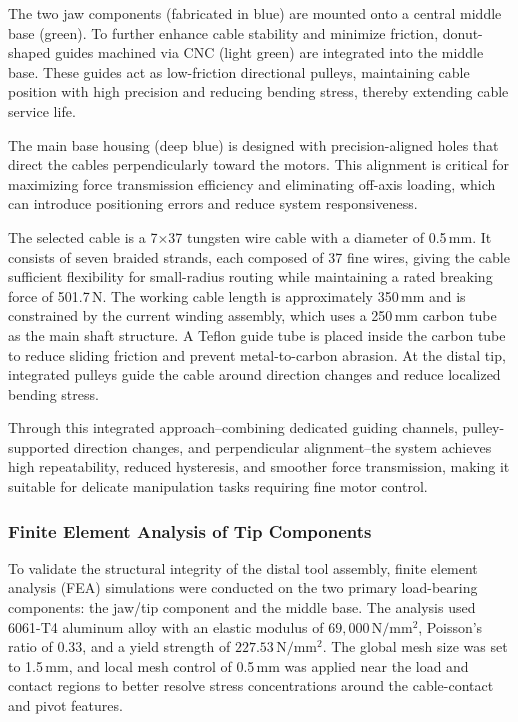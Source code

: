 The two jaw components (fabricated in blue) are mounted onto a central middle base (green). To further enhance cable stability and minimize friction, donut-shaped guides machined via CNC (light green) are integrated into the middle base. These guides act as low-friction directional pulleys, maintaining cable position with high precision and reducing bending stress, thereby extending cable service life.

The main base housing (deep blue) is designed with precision-aligned holes that direct the cables perpendicularly toward the motors. This alignment is critical for maximizing force transmission efficiency and eliminating off-axis loading, which can introduce positioning errors and reduce system responsiveness.

The selected cable is a 7$\times$37 tungsten wire cable with a diameter of 0.5\,mm. It consists of seven braided strands, each composed of 37 fine wires, giving the cable sufficient flexibility for small-radius routing while maintaining a rated breaking force of 501.7\,N. The working cable length is approximately 350\,mm and is constrained by the current winding assembly, which uses a 250\,mm carbon tube as the main shaft structure. A Teflon guide tube is placed inside the carbon tube to reduce sliding friction and prevent metal-to-carbon abrasion. At the distal tip, integrated pulleys guide the cable around direction changes and reduce localized bending stress.

Through this integrated approach--combining dedicated guiding channels, pulley-supported direction changes, and perpendicular alignment--the system achieves high repeatability, reduced hysteresis, and smoother force transmission, making it suitable for delicate manipulation tasks requiring fine motor control.

\subsubsection{Finite Element Analysis of Tip Components}
\label{sec:tip_fea}
To validate the structural integrity of the distal tool assembly, finite element analysis (FEA) simulations were conducted on the two primary load-bearing components: the jaw/tip component and the middle base. The analysis used 6061-T4 aluminum alloy with an elastic modulus of $69{,}000\,\mathrm{N/mm^2}$, Poisson's ratio of 0.33, and a yield strength of $227.53\,\mathrm{N/mm^2}$. The global mesh size was set to 1.5\,mm, and local mesh control of 0.5\,mm was applied near the load and contact regions to better resolve stress concentrations around the cable-contact and pivot features.

